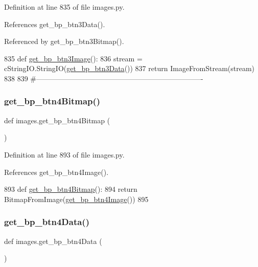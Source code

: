 Definition at line 835 of file images.\+py.



References get\+\_\+bp\+\_\+btn3\+Data().



Referenced by get\+\_\+bp\+\_\+btn3\+Bitmap().


\begin{DoxyCode}
835 \textcolor{keyword}{def }\hyperlink{namespaceimages_a4a775bb497640194045625f016d30596}{get\_bp\_btn3Image}():
836     stream = cStringIO.StringIO(\hyperlink{namespaceimages_ab1f0d8c363fbca669998deb88699c3d6}{get\_bp\_btn3Data}())
837     \textcolor{keywordflow}{return} ImageFromStream(stream)
838 
839 \textcolor{comment}{#----------------------------------------------------------------------}
\end{DoxyCode}
\mbox{\label{namespaceimages_aab3dcebc8b03f07f787b4d0edc66f559}} 
\subsubsection{\texorpdfstring{get\+\_\+bp\+\_\+btn4\+Bitmap()}{get\_bp\_btn4Bitmap()}}
{\footnotesize\ttfamily def images.\+get\+\_\+bp\+\_\+btn4\+Bitmap (\begin{DoxyParamCaption}{ }\end{DoxyParamCaption})}



Definition at line 893 of file images.\+py.



References get\+\_\+bp\+\_\+btn4\+Image().


\begin{DoxyCode}
893 \textcolor{keyword}{def }\hyperlink{namespaceimages_aab3dcebc8b03f07f787b4d0edc66f559}{get\_bp\_btn4Bitmap}():
894     \textcolor{keywordflow}{return} BitmapFromImage(\hyperlink{namespaceimages_a62db2969eb50a2642e6e0f418bdb0ccc}{get\_bp\_btn4Image}())
895 
\end{DoxyCode}
\mbox{\label{namespaceimages_aabed8c0b0b17b674f4da05e431d02b0e}} 
\subsubsection{\texorpdfstring{get\+\_\+bp\+\_\+btn4\+Data()}{get\_bp\_btn4Data()}}
{\footnotesize\ttfamily def images.\+get\+\_\+bp\+\_\+btn4\+Data (\begin{DoxyParamCaption}{ }\end{DoxyParamCaption})}




